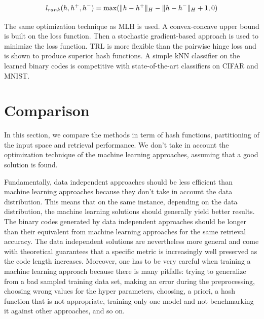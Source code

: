\[
	l_{rank}(h, h^{+}, h^{-})=\max(\lVert h - h^{+}\rVert_{H} - \lVert h - h^{-}\rVert_{H} + 1, 0)
\]

The same optimization technique as MLH is used. A convex-concave upper bound is built on the loss function. Then a stochastic gradient-based approach is used to minimize the loss function. TRL is more flexible than the pairwise hinge loss and is shown to produce superior hash functions. A simple kNN classifier on the learned binary codes is competitive with state-of-the-art classifiers on CIFAR and MNIST.

\section{Comparison}
In this section, we compare the methods in term of hash functions, partitioning of the input space and retrieval performance. We don't take in account the optimization technique of the machine learning approaches, assuming that a good solution is found.

Fundamentally, data independent approaches should be less efficient than machine learning approaches because they don't take in account the data distribution. This means that on the same instance, depending on the data distribution, the machine learning solutions should generally yield better results. The binary codes generated by data independent approaches should be longer than their equivalent from machine learning approaches for the same retrieval accuracy. The data independent solutions are nevertheless more general and come with theoretical guarantees that a specific metric is increasingly well preserved as the code length increases. Moreover, one has to be very careful when training a machine learning approach because there is many pitfalls: trying to generalize from a bad sampled training data set, making an error during the preprocessing, choosing wrong values for the hyper parameters, choosing, a priori, a hash function that is not appropriate, training only one model and not benchmarking it against other approaches, and so on.

